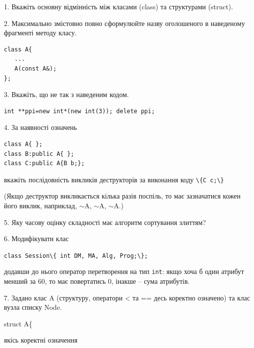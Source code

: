 \documentclass[12pt, ukrainian]{article}
\def\code#1{\Verb!#1!}
\begin{document}
{%
1. Вкажіть основну відмінність між класами (class) та структурами (struct).%
\par
\vspace{2mm}
2. Максимально змістовно повно сформулюйте назву оголошеного в наведеному фрагменті методу класу.
\vspace{-3mm}
\begin{verbatim}class A{
   ...
   A(const A&);
};\end{verbatim}
\vspace{-3mm}
\par
\vspace{2mm}
3. Вкажіть, що не так з наведеним кодом.
\vspace{-3mm}
\begin{verbatim}int **ppi=new int*(new int(3)); delete ppi;\end{verbatim}
\vspace{-3mm}
\par
\vspace{2mm}
4. За наявності означень
\vspace{-3mm}
\begin{verbatim}
class A{ };
class B:public A{ };
class C:public A{B b;};\end{verbatim}
\vspace{-3mm}
вкажіть послідовність викликів деструкторів за виконання коду \code{\{C c;\}} 

(Якщо деструктор викликається кілька разів поспіль, то має зазначатися кожен його виклик, наприклад, $\sim$A, $\sim$A, $\sim$A.)

\vspace{2mm}
5. Яку часову оцінку складності має алгоритм сортування злиттям?
\par
\vspace{2mm}
6. Модифікувати клас 

\qquad\code{class Session\{ int DM, MA, Alg, Prog;\};} 


додавши до нього оператор перетворення на тип \code{int}: якщо хоча б один атрибут менший за 60, то має повертатись 0, інакше -- сума атрибутів.%
\par
\vspace{2mm}
7. 
Задано клас A (структуру, оператори < та == десь коректно означено) та клас вузла списку Node.

struct A\{

\quad  якісь коректні означення 

}
\end{document}
